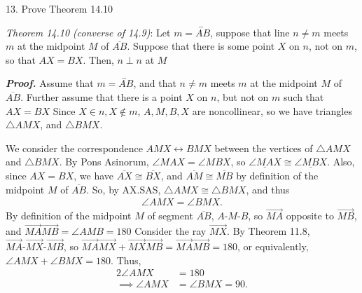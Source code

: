 \documentclass{report}
\begin{document}
    \bigbreak \noindent 
    \begin{mdframed}
        13. Prove Theorem 14.10
    \end{mdframed}
    \bigbreak \noindent 
    \begin{remark}
        \textit{Theorem 14.10 (converse of 14.9)}: Let $m = \overleftrightarrow{AB}$, suppose that line $n\ne m$ meets $m$ at the midpoint $M$ of $\overline{AB}$. Suppose that there is some point $X$ on $n$, not on $m$, so that $AX = BX$. Then, $n \perp n$ at $M$
    \end{remark}
    \bigbreak \noindent 
    \textbf{\textit{Proof.}} Assume that $ m = \overleftrightarrow{AB}$, and that $ n \ne m$ meets $m$ at the midpoint $M$ of $\overline{AB}$. Further assume that there is a point $X$ on $n$, but not on $m$ such that $AX = BX$
    \bigbreak \noindent 
    Since $X \in n, X \not\in m$, $ A,M,B,X$ are noncollinear, so we have triangles $ \triangle AMX$, and $\triangle BMX$.
    \bigbreak \noindent 
    \begin{figure}[ht]
        \centering
        \label{fig:tri2}
    \end{figure}
    \bigbreak \noindent 
    We consider the correspondence $AMX \leftrightarrow BMX$ between the vertices of $\triangle AMX$ and $ \triangle BMX $.
    \bigbreak \noindent 
    By Pons Asinorum, $\angle MAX = \angle MBX$, so $\underline{\angle MAX} \cong \underline{\angle MBX}$. Also, since $AX = BX$, we have $\overline{AX} \cong \overline{BX}$, and $\overline{AM} \cong \overline{MB}$ by definition of the midpoint $M$ of $\overline{AB}$. So, by AX.SAS, $\triangle AMX \cong \triangle BMX$, and thus
    \begin{align*}
        \angle AMX = \angle BMX
    .\end{align*}
    By definition of the midpoint $M$ of segment $\overline{AB} $, $ A\text{-}M\text{-}B$, so $ \overrightarrow{MA}$ opposite to $ \overrightarrow{MB}$, and $\overrightarrow{MA}\overrightarrow{MB} = \angle AMB =180 $
    \bigbreak \noindent 
    Consider the ray $\overrightarrow{MX}$. By Theorem 11.8, $ \overrightarrow{MA}\text{-}\overrightarrow{MX}\text{-}\overrightarrow{MB} $, so $ \overrightarrow{MA}\overrightarrow{MX} + \overrightarrow{MX}\overrightarrow{MB} = \overrightarrow{MA}\overrightarrow{MB} = 180  $, or equivalently, $ \angle AMX + \angle BMX = 180$. Thus, 
    \begin{align*}
        2\angle AMX &= 180 \\
        \implies \angle AMX &= \angle BMX = 90
    .\end{align*}
\end{document}
